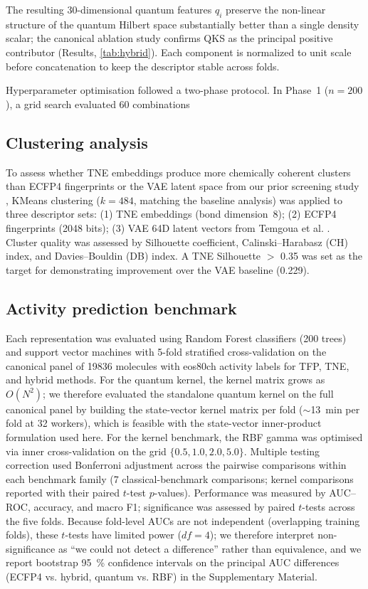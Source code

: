 \documentclass[11pt,a4paper]{article}
\begin{document}
The resulting 30-dimensional quantum features $q_i$ preserve the non-linear structure of the quantum Hilbert space substantially better than a single density scalar; the canonical ablation study confirms QKS as the principal positive contributor (Results, \cref{tab:hybrid}). Each component is normalized to unit scale before concatenation to keep the descriptor stable across folds.

Hyperparameter optimisation followed a two-phase protocol. In Phase~1 ($n = \num{200}$), a grid search evaluated \num{60} combinations

\subsection{Clustering analysis}

To assess whether TNE embeddings produce more chemically coherent clusters than ECFP4 fingerprints or the VAE latent space from our prior screening study \citep{temgoua2026antimalarial}, KMeans clustering ($k = 484$, matching the baseline analysis) was applied to three descriptor sets: (1) TNE embeddings (bond dimension~8); (2) ECFP4 fingerprints (\num{2048} bits); (3) VAE 64D latent vectors from Temgoua et al. \citep{temgoua2026antimalarial}. Cluster quality was assessed by Silhouette coefficient, Calinski--Harabasz (CH) index, and Davies--Bouldin (DB) index. A TNE Silhouette $>$ \num{0.35} was set as the target for demonstrating improvement over the VAE baseline (\num{0.229}).

\subsection{Activity prediction benchmark}

Each representation was evaluated using Random Forest classifiers (\num{200} trees) and support vector machines with 5-fold stratified cross-validation on the canonical panel of \num{19836} molecules with eos80ch activity labels for TFP, TNE, and hybrid methods. For the quantum kernel, the kernel matrix grows as $O(N^2)$; we therefore evaluated the standalone quantum kernel on the full canonical panel by building the state-vector kernel matrix per fold ($\sim$\SI{13}{\minute} per fold at 32 workers), which is feasible with the state-vector inner-product formulation used here. For the kernel benchmark, the RBF gamma was optimised via inner cross-validation on the grid $\{0.5, 1.0, 2.0, 5.0\}$. Multiple testing correction used Bonferroni adjustment across the pairwise comparisons within each benchmark family (7 classical-benchmark comparisons; kernel comparisons reported with their paired $t$-test $p$-values). Performance was measured by AUC--ROC, accuracy, and macro F1; significance was assessed by paired $t$-tests across the five folds. Because fold-level AUCs are not independent (overlapping training folds), these $t$-tests have limited power ($df = 4$); we therefore interpret non-significance as ``we could not detect a difference'' rather than equivalence, and we report bootstrap \qty{95}{\percent} confidence intervals on the principal AUC differences (ECFP4 vs. hybrid, quantum vs. RBF) in the Supplementary Material.
\end{document}
